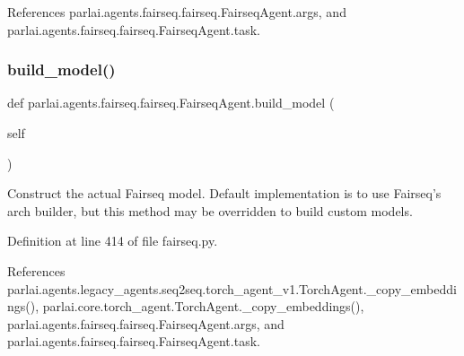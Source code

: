 References parlai.\+agents.\+fairseq.\+fairseq.\+Fairseq\+Agent.\+args, and parlai.\+agents.\+fairseq.\+fairseq.\+Fairseq\+Agent.\+task.

\mbox{\label{classparlai_1_1agents_1_1fairseq_1_1fairseq_1_1FairseqAgent_a275a60cb93929725725d103fc76905ba}} 
\subsubsection{\texorpdfstring{build\+\_\+model()}{build\_model()}}
{\footnotesize\ttfamily def parlai.\+agents.\+fairseq.\+fairseq.\+Fairseq\+Agent.\+build\+\_\+model (\begin{DoxyParamCaption}\item[{}]{self }\end{DoxyParamCaption})}

\begin{DoxyVerb}Construct the actual Fairseq model. Default implementation is to use
Fairseq's arch builder, but this method may be overridden to build custom
models.
\end{DoxyVerb}
 

Definition at line 414 of file fairseq.\+py.



References parlai.\+agents.\+legacy\+\_\+agents.\+seq2seq.\+torch\+\_\+agent\+\_\+v1.\+Torch\+Agent.\+\_\+copy\+\_\+embeddings(), parlai.\+core.\+torch\+\_\+agent.\+Torch\+Agent.\+\_\+copy\+\_\+embeddings(), parlai.\+agents.\+fairseq.\+fairseq.\+Fairseq\+Agent.\+args, and parlai.\+agents.\+fairseq.\+fairseq.\+Fairseq\+Agent.\+task.


